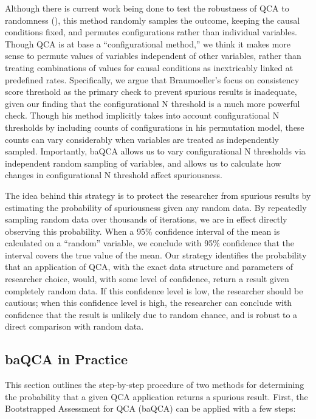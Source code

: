 \documentclass[12pt]{article}
\begin{document}
{{{{Although there is current work being done to test the robustness of QCA to randomness (\citealt{braumoeller_2015,braumoeller_2015data}), this method randomly samples the outcome, keeping the causal conditions fixed, and permutes configurations rather than individual variables. Though QCA is at base a ``configurational method,'' we think it makes more sense to permute values of variables independent of other variables, rather than treating combinations of values for causal conditions as inextricably linked at predefined rates. Specifically, we argue that Braumoeller's focus on consistency score threshold as the primary check to prevent spurious results is inadequate, given our finding that the configurational N threshold is a much more powerful check. Though his method implicitly takes into account configurational N thresholds by including counts of configurations in his permutation model, these counts can vary considerably when variables are treated as independently sampled. Importantly, baQCA allows us to vary configurational N thresholds via independent random sampling of variables, and allows us to calculate how changes in configurational N threshold affect spuriousness. 

The idea behind this strategy is to protect the researcher from spurious results by estimating the probability of spuriousness given any random data. By repeatedly sampling random data over thousands of iterations, we are in effect directly observing this probability. When a 95\% confidence interval of the mean is calculated on a ``random'' variable, we conclude with 95\% confidence that the interval covers the true value of the mean. Our strategy identifies the probability that an application of QCA, with the exact data structure and parameters of researcher choice, would, with some level of confidence, return a result given completely random data. If this confidence level is low, the researcher should be cautious; when this confidence level is high, the researcher can conclude with confidence that the result is unlikely due to random chance, and is robust to a direct comparison with random data. 



\subsection{baQCA in Practice}

This section outlines the step-by-step procedure of two methods for determining the probability that a given QCA application returns a spurious result. First, the Bootstrapped Assessment for QCA (baQCA) can be applied with a few steps: 

}}}}
\end{document}
